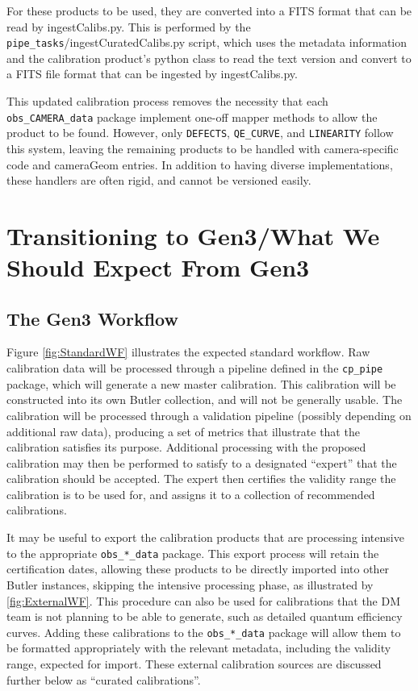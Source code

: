 \documentclass[DM,authoryear,toc]{lsstdoc}
\begin{document}
For these products to be used, they are converted into a FITS format
that can be read by ingestCalibs.py.  This is performed by the
\verb|pipe_tasks|/ingestCuratedCalibs.py script, which uses the
metadata information and the calibration product's python class to
read the text version and convert to a FITS file format that can be
ingested by ingestCalibs.py.

This updated calibration process removes the necessity that each
\verb|obs_CAMERA_data| package implement one-off mapper methods to
allow the product to be found.  However, only \verb|DEFECTS|,
\verb|QE_CURVE|, and \verb|LINEARITY| follow this system, leaving the
remaining products to be handled with camera-specific code and
cameraGeom entries.  In addition to having diverse implementations,
these handlers are often rigid, and cannot be versioned easily.

\section{Transitioning to Gen3/What We Should Expect From Gen3}

\subsection{The Gen3 Workflow}

Figure \ref{fig:StandardWF} illustrates the expected standard workflow.
Raw calibration data will be processed through a pipeline defined in
the \verb|cp_pipe| package, which will generate a new master
calibration.  This calibration will be constructed into its own Butler
collection, and will not be generally usable.  The calibration will be
processed through a validation pipeline (possibly depending on
additional raw data), producing a set of metrics that illustrate that
the calibration satisfies its purpose.  Additional processing with the
proposed calibration may then be performed to satisfy to a designated
``expert'' that the calibration should be accepted.  The expert then
certifies the validity range the calibration is to be used for, and
assigns it to a collection of recommended calibrations.

It may be useful to export the calibration products that are
processing intensive to the appropriate \verb|obs_*_data| package.
This export process will retain the certification dates, allowing
these products to be directly imported into other Butler instances,
skipping the intensive processing phase, as illustrated by
\ref{fig:ExternalWF}.  This procedure can also be used for calibrations
that the DM team is not planning to be able to generate, such as
detailed quantum efficiency curves.  Adding these calibrations to the
\verb|obs_*_data| package will allow them to be formatted
appropriately with the relevant metadata, including the validity
range, expected for import.  These external calibration sources are
discussed further below as ``curated calibrations''.
\end{document}
